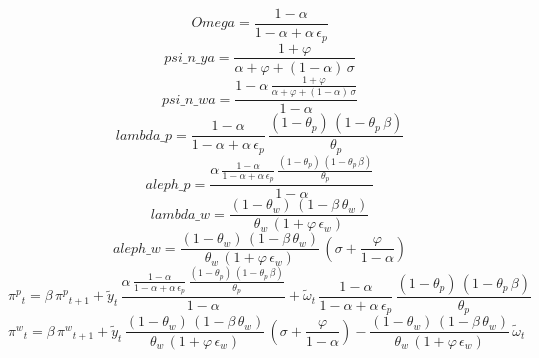 \begin{dmath*}
Omega = \frac{1-{{\alpha}}}{1-{{\alpha}}+{{\alpha}}\, {{\epsilon_p}}}
\end{dmath*}
\begin{dmath*}
psi\_n\_ya = \frac{1+{{\varphi}}}{{{\alpha}}+{{\varphi}}+\left(1-{{\alpha}}\right)\, {{\sigma}}}
\end{dmath*}
\begin{dmath*}
psi\_n\_wa = \frac{1-{{\alpha}}\, \frac{1+{{\varphi}}}{{{\alpha}}+{{\varphi}}+\left(1-{{\alpha}}\right)\, {{\sigma}}}}{1-{{\alpha}}}
\end{dmath*}
\begin{dmath*}
lambda\_p = \frac{1-{{\alpha}}}{1-{{\alpha}}+{{\alpha}}\, {{\epsilon_p}}}\, \frac{\left(1-{{\theta_p}}\right)\, \left(1-{{\theta_p}}\, {{\beta}}\right)}{{{\theta_p}}}
\end{dmath*}
\begin{dmath*}
aleph\_p = \frac{{{\alpha}}\, \frac{1-{{\alpha}}}{1-{{\alpha}}+{{\alpha}}\, {{\epsilon_p}}}\, \frac{\left(1-{{\theta_p}}\right)\, \left(1-{{\theta_p}}\, {{\beta}}\right)}{{{\theta_p}}}}{1-{{\alpha}}}
\end{dmath*}
\begin{dmath*}
lambda\_w = \frac{\left(1-{{\theta_w}}\right)\, \left(1-{{\beta}}\, {{\theta_w}}\right)}{{{\theta_w}}\, \left(1+{{\varphi}}\, {{\epsilon_w}}\right)}
\end{dmath*}
\begin{dmath*}
aleph\_w = \frac{\left(1-{{\theta_w}}\right)\, \left(1-{{\beta}}\, {{\theta_w}}\right)}{{{\theta_w}}\, \left(1+{{\varphi}}\, {{\epsilon_w}}\right)}\, \left({{\sigma}}+\frac{{{\varphi}}}{1-{{\alpha}}}\right)
\end{dmath*}
\begin{dmath}
{{\pi^p}}_{t}={{\beta}}\, {{\pi^p}}_{t+1}+{{\tilde y}}_{t}\, \frac{{{\alpha}}\, \frac{1-{{\alpha}}}{1-{{\alpha}}+{{\alpha}}\, {{\epsilon_p}}}\, \frac{\left(1-{{\theta_p}}\right)\, \left(1-{{\theta_p}}\, {{\beta}}\right)}{{{\theta_p}}}}{1-{{\alpha}}}+{{\tilde \omega}}_{t}\, \frac{1-{{\alpha}}}{1-{{\alpha}}+{{\alpha}}\, {{\epsilon_p}}}\, \frac{\left(1-{{\theta_p}}\right)\, \left(1-{{\theta_p}}\, {{\beta}}\right)}{{{\theta_p}}}
\end{dmath}
\begin{dmath}
{{\pi^w}}_{t}={{\beta}}\, {{\pi^w}}_{t+1}+{{\tilde y}}_{t}\, \frac{\left(1-{{\theta_w}}\right)\, \left(1-{{\beta}}\, {{\theta_w}}\right)}{{{\theta_w}}\, \left(1+{{\varphi}}\, {{\epsilon_w}}\right)}\, \left({{\sigma}}+\frac{{{\varphi}}}{1-{{\alpha}}}\right)-\frac{\left(1-{{\theta_w}}\right)\, \left(1-{{\beta}}\, {{\theta_w}}\right)}{{{\theta_w}}\, \left(1+{{\varphi}}\, {{\epsilon_w}}\right)}\, {{\tilde \omega}}_{t}
\end{dmath}
